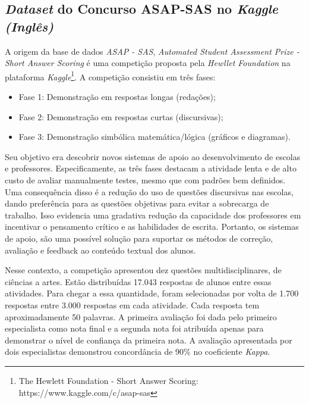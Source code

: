 \subsection{\textit{Dataset} do Concurso ASAP-SAS no \textit{Kaggle} \textit{(Inglês)}}
\label{kaggle-db}

A origem da base de dados \textit{ASAP - SAS}, \textit{Automated Student Assessment Prize - Short Answer Scoring} é uma competição proposta pela \textit{Hewllet Foundation} na plataforma \textit{Kaggle}\footnote{The Hewlett Foundation - Short Answer Scoring: https://www.kaggle.com/c/asap-sas}. A competição consistiu em três fases:

\begin{itemize}
\item Fase 1:  Demonstração em respostas longas (redações); 
\item Fase 2:  Demonstração em respostas curtas (discursivas);
\item Fase 3:  Demonstração simbólica matemática/lógica (gráficos e diagramas).
\end{itemize}

Seu objetivo era descobrir novos sistemas de apoio ao desenvolvimento de escolas e professores. Especificamente, as três fases destacam a atividade lenta e de alto custo de avaliar manualmente testes, mesmo que com padrões bem definidos. Uma consequência disso é a redução do uso de questões discursivas nas escolas, dando preferência para as questões objetivas para evitar a sobrecarga de trabalho. Isso evidencia uma gradativa redução da capacidade dos professores em incentivar o pensamento crítico e as habilidades de escrita. Portanto, os sistemas de apoio, são uma possível solução para suportar os métodos de correção, avaliação e feedback ao conteúdo textual dos alunos.

Nesse contexto, a competição apresentou dez questões multidisciplinares, de ciências a artes. Estão distribuídas 17.043 respostas de alunos entre essas atividades. Para chegar a essa quantidade, foram selecionadas por volta de 1.700 respostas entre 3.000 respostas em cada atividade. Cada resposta tem aproximadamente 50 palavras. A primeira avaliação foi dada pelo primeiro especialista como nota final e a segunda nota foi atribuída apenas para demonstrar o nível de confiança da primeira nota. A avaliação apresentada por dois especialistas demonstrou concordância de 90\% no coeficiente \textit{Kappa}.


